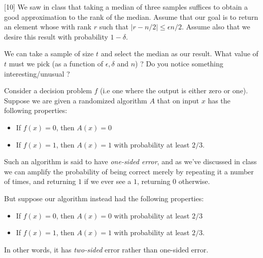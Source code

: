 \documentclass[addpoints]{exam}
\begin{document}
\begin{questions}
\begin{parts}
\end{parts}

[10]
We saw in class that taking a median of three samples suffices to obtain a good
approximation to the rank of the median. Assume that our goal is to return an
element whose with rank $r$ such that $|r - n/2| \le \epsilon n/2$. Assume also
that we desire this result with probability $1-\delta$. 

We can take a sample of size $t$ and select the median as our result. What
value of $t$ must we pick (as a function of $\epsilon, \delta$ and $n$) ? Do you
notice something interesting/unusual ? 



  Consider a decision problem $f$ (i.e one where the output is either zero or
  one). Suppose we are given a randomized algorithm $A$ that on input $x$ has
  the following properties:
  \begin{itemize}
  \item If $f(x) = 0$, then $A(x) = 0$
  \item If $f(x) = 1$, then $A(x) = 1$ with probability at least $2/3$.
  \end{itemize}
  Such an algorithm is said to have \emph{one-sided error}, and as we've
  discussed in class we can amplify the probability of being correct merely by
  repeating it a number of times, and returning $1$ if we ever see a $1$,
  returning $0$ otherwise.

  But suppose our algorithm instead had the following properties:
  \begin{itemize}
  \item If $f(x) = 0$, then $A(x) = 0$ with probability at least $2/3$
  \item If $f(x) = 1$, then $A(x) = 1$ with probability at least $2/3$.
  \end{itemize}
  In other words, it has \emph{two-sided} error rather than one-sided error.
\end{questions}
\end{document}
